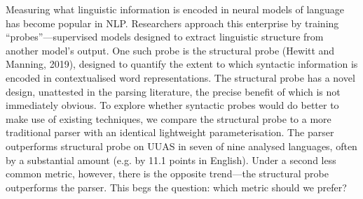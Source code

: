 Measuring what linguistic information is encoded in neural models of language has become popular in NLP.  Researchers approach this enterprise by training ``probes''—supervised models designed to extract linguistic structure from another model's output. One such probe is the structural probe (Hewitt and Manning, 2019), designed to quantify the extent to which syntactic information is encoded in contextualised word representations. The structural probe has a novel design, unattested in  the parsing literature, the precise benefit of which is not immediately obvious. To explore whether syntactic probes would do better to make use of existing techniques, we compare the structural probe  to a more traditional parser with an identical lightweight parameterisation. The parser outperforms structural probe on UUAS in seven of nine analysed languages, often by a substantial amount (e.g. by 11.1 points in English). Under a second less common metric, however, there is the opposite trend—the structural probe outperforms the parser. This begs the question: which metric should we prefer?
